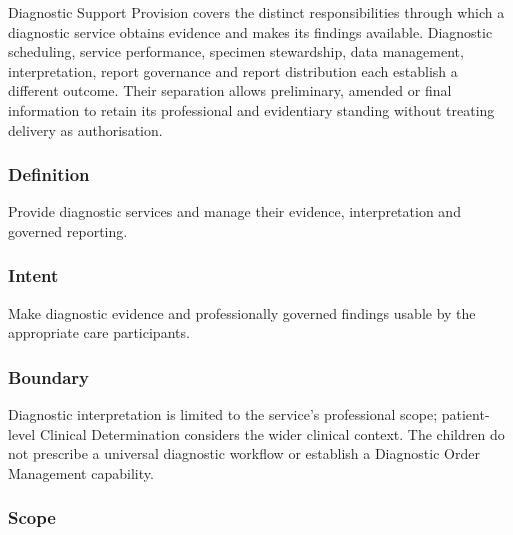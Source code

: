 Diagnostic Support Provision covers the distinct responsibilities through which a diagnostic service obtains evidence and makes its findings available. Diagnostic scheduling, service performance, specimen stewardship, data management, interpretation, report governance and report distribution each establish a different outcome. Their separation allows preliminary, amended or final information to retain its professional and evidentiary standing without treating delivery as authorisation.

\subsubsection*{Definition}

Provide diagnostic services and manage their evidence, interpretation and governed reporting.

\subsubsection*{Intent}

Make diagnostic evidence and professionally governed findings usable by the appropriate care participants.

\subsubsection*{Boundary}

Diagnostic interpretation is limited to the service's professional scope; patient-level Clinical Determination considers the wider clinical context. The children do not prescribe a universal diagnostic workflow or establish a Diagnostic Order Management capability.

\subsubsection*{Scope}

